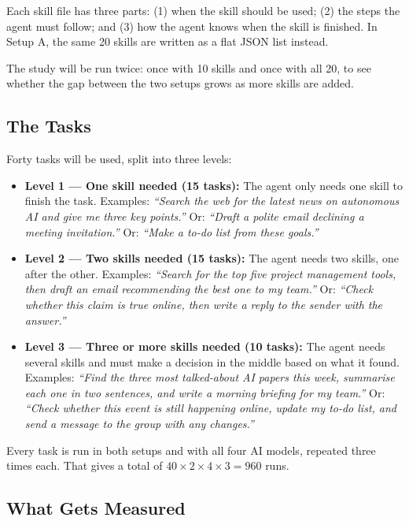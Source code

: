 Each skill file has three parts: (1) when the skill should be used; (2) the steps the agent must follow; and (3) how the agent knows when the skill is finished. In Setup A, the same 20 skills are written as a flat JSON list instead.

The study will be run twice: once with 10 skills and once with all 20, to see whether the gap between the two setups grows as more skills are added.

\subsection{The Tasks}

Forty tasks will be used, split into three levels:

\begin{itemize}
    \item \textbf{Level 1 --- One skill needed (15 tasks):} The agent only needs one skill to finish the task. Examples: \textit{``Search the web for the latest news on autonomous AI and give me three key points.''} Or: \textit{``Draft a polite email declining a meeting invitation.''} Or: \textit{``Make a to-do list from these goals.''}

    \item \textbf{Level 2 --- Two skills needed (15 tasks):} The agent needs two skills, one after the other. Examples: \textit{``Search for the top five project management tools, then draft an email recommending the best one to my team.''} Or: \textit{``Check whether this claim is true online, then write a reply to the sender with the answer.''}

    \item \textbf{Level 3 --- Three or more skills needed (10 tasks):} The agent needs several skills and must make a decision in the middle based on what it found. Examples: \textit{``Find the three most talked-about AI papers this week, summarise each one in two sentences, and write a morning briefing for my team.''} Or: \textit{``Check whether this event is still happening online, update my to-do list, and send a message to the group with any changes.''}
\end{itemize}

Every task is run in both setups and with all four AI models, repeated three times each. That gives a total of $40 \times 2 \times 4 \times 3 = 960$ runs.

\subsection{What Gets Measured}

